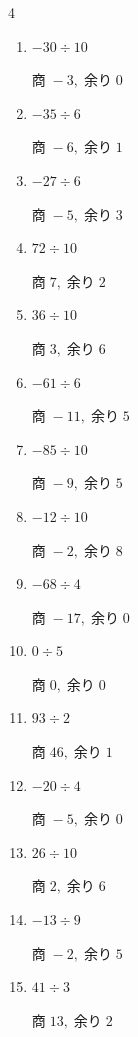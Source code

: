\begin{multicols}{4}
\begin{enumerate}
        $商\; -5,\; 余り\; 0$

  \item $-30 \div 10$

        $商\; -3,\; 余り\; 0$

  \item $-35 \div 6$

        $商\; -6,\; 余り\; 1$

  \item $-27 \div 6$

        $商\; -5,\; 余り\; 3$

  \item $72 \div 10$

        $商\; 7,\; 余り\; 2$

  \item $36 \div 10$

        $商\; 3,\; 余り\; 6$

  \item $-61 \div 6$

        $商\; -11,\; 余り\; 5$

  \item $-85 \div 10$

        $商\; -9,\; 余り\; 5$

  \item $-12 \div 10$

        $商\; -2,\; 余り\; 8$

  \item $-68 \div 4$

        $商\; -17,\; 余り\; 0$

  \item $0 \div 5$

        $商\; 0,\; 余り\; 0$

  \item $93 \div 2$

        $商\; 46,\; 余り\; 1$

  \item $-20 \div 4$

        $商\; -5,\; 余り\; 0$

  \item $26 \div 10$

        $商\; 2,\; 余り\; 6$

  \item $-13 \div 9$

        $商\; -2,\; 余り\; 5$

  \item $41 \div 3$

        $商\; 13,\; 余り\; 2$


\end{enumerate}
\end{multicols}

